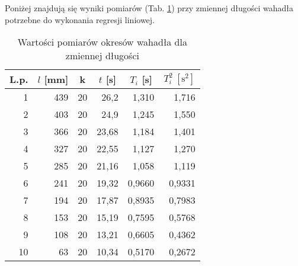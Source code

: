 \documentclass[12pt,a4paper]{article}
\begin{document}
Poniżej znajdują się wyniki pomiarów (Tab. \ref{tab:tab2}) przy zmiennej długości wahadła potrzebne do wykonania regresji liniowej.
\begin{table}[!ht]
	\caption{Wartości pomiarów okresów wahadła dla zmiennej długości}
	\begin{center}
		\begin{tabular}{r|r|r|r|r|r}
			\hline
			\multicolumn{1}{c|}{L.p.} & \multicolumn{1}{c|}{$l$ [mm]} & \multicolumn{1}{c|}{k} & \multicolumn{1}{c|}{$t$ [s]} & \multicolumn{1}{c|}{$T_i$ [s]} & \multicolumn{1}{c}{$T_{i}^{2} ~[\textrm{s}^2]$} \\ \hline \hline
			1 & 439 & 20 & 26,2 & 1,310 & 1,716 \\
			2 & 403 & 20 & 24,9 & 1,245 & 1,550 \\
			3 & 366 & 20 & 23,68 & 1,184 & 1,401 \\
			4 & 327 & 20 & 22,55 & 1,127 & 1,270 \\
			5 & 285 & 20 & 21,16 & 1,058 & 1,119\\
			6 & 241 & 20 & 19,32 & 0,9660 & 0,9331 \\
			7 & 194 & 20 & 17,87 & 0,8935 & 0,7983 \\
			8 & 153 & 20 & 15,19 & 0,7595 & 0,5768 \\
			9 & 108 & 20 & 13,21 & 0,6605 & 0,4362 \\
			10 & 63 & 20 & 10,34 & 0,5170 & 0,2672 \\ \hline
		\end{tabular}
	\end{center}
	\label{tab:tab2}
\end{table}
\end{document}
